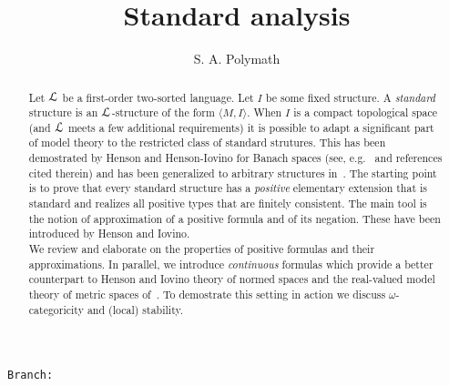 \documentclass{amsproc}
\author{S. A. Polymath}
\newcommand\branch{}
\begin{document}
\title{Standard analysis}
\hfill\texttt{Branch:\ \branch\ \DTMnow}\bigskip
\maketitle
\raggedbottom

\begin{abstract}
  Let ${\EuScript L}$ be a first-order two-sorted language.
  Let $I$ be some fixed structure.
  A \textit{standard\/} structure is an ${\EuScript L}$-structure of the form $\langle M,I\rangle$.
  When $I$ is a compact topological space (and ${\EuScript L}$ meets a few additional requirements) it is possible to adapt a significant part of model theory to the restricted class of standard strutures.
  This has been demostrated by Henson and Henson-Iovino for Banach spaces (see, e.g.~\cite{HI} and references cited therein) and has been generalized to arbitrary structures in~\cite{clcl}.
  The starting point is to prove that every standard structure has a \textit{positive\/} elementary extension that is standard and realizes all positive types that are finitely consistent.
  The main tool is the notion of approximation of a positive formula and of its negation.
  These have been introduced by Henson and Iovino.\\[1ex]
  \noindent
  We review and elaborate on the properties of positive formulas and their approximations.
  In parallel, we introduce \textit{continuous\/} formulas which provide a better counterpart to Henson and Iovino theory of normed spaces and the real-valued model theory of metric spaces of~\cite{BBHU}.
  To demostrate this setting in action we discuss $\omega$-categoricity and (local) stability.
\end{abstract}


\end{document}
